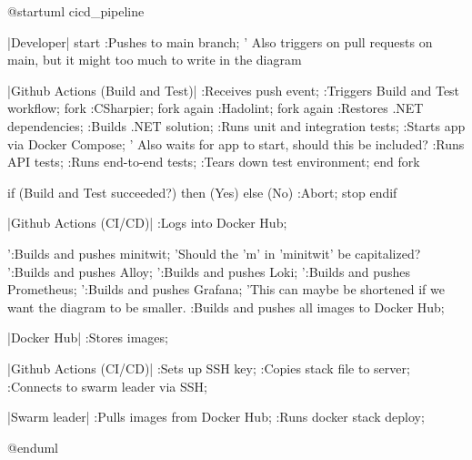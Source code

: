 \begin{plantuml}
    @startuml cicd_pipeline

    |Developer|
    start
    :Pushes to main branch;
    ' Also triggers on pull requests on main, but it might too much to write in the diagram

    |Github Actions (Build and Test)|
    :Receives push event;
    :Triggers Build and Test workflow;
    fork
        :CSharpier;
    fork again
        :Hadolint;
    fork again
        :Restores .NET dependencies;
        :Builds .NET solution;
        :Runs unit and integration tests;
        :Starts app via Docker Compose;
        ' Also waits for app to start, should this be included?
        :Runs API tests;
        :Runs end-to-end tests;
        :Tears down test environment;
    end fork

    if (Build and Test succeeded?) then (Yes)
    else (No)
        :Abort;
        stop
    endif

    |Github Actions (CI/CD)|
    :Logs into Docker Hub;

    ':Builds and pushes minitwit;
    'Should the 'm' in 'minitwit' be capitalized?
    ':Builds and pushes Alloy;
    ':Builds and pushes Loki;
    ':Builds and pushes Prometheus;
    ':Builds and pushes Grafana;
    'This can maybe be shortened if we want the diagram to be smaller.
    :Builds and pushes all images to Docker Hub;


    |Docker Hub|
    :Stores images;

    |Github Actions (CI/CD)|
    :Sets up SSH key;
    :Copies stack file to server;
    :Connects to swarm leader via SSH;


    |Swarm leader|
    :Pulls images from Docker Hub;
    :Runs docker stack deploy;


    @enduml
\end{plantuml}